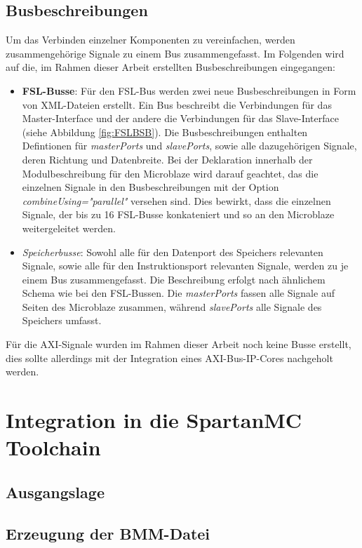 \subsection{Busbeschreibungen}\label{subsec:BusDesc}
Um das Verbinden einzelner Komponenten zu vereinfachen, werden zusammengehörige Signale zu einem Bus zusammengefasst. Im Folgenden wird auf die, im Rahmen dieser Arbeit erstellten Busbeschreibungen eingegangen:
\begin{itemize}
\item \textbf{FSL-Busse}: Für den FSL-Bus werden zwei neue Busbeschreibungen in Form von XML-Dateien erstellt. Ein Bus beschreibt die Verbindungen für das Master-Interface und der andere die Verbindungen für das Slave-Interface (siehe Abbildung \ref{fig:FSLBSB}). Die Busbeschreibungen enthalten Defintionen für \textit{masterPorts} und \textit{slavePorts}, sowie alle dazugehörigen Signale, deren Richtung und Datenbreite.
Bei der Deklaration innerhalb der Modulbeschreibung für den Microblaze wird darauf geachtet, das die einzelnen Signale in den Busbeschreibungen mit der Option \textit{combineUsing="parallel"} versehen sind. Dies bewirkt, dass die einzelnen Signale, der bis zu 16 FSL-Busse konkateniert und so an den Microblaze weitergeleitet werden.
\item \textit{Speicherbusse}: Sowohl alle für den Datenport des Speichers relevanten Signale, sowie alle für den Instruktionsport relevanten Signale, werden zu je einem Bus zusammengefasst. Die Beschreibung erfolgt nach ähnlichem Schema wie bei den FSL-Bussen. Die \textit{masterPorts} fassen alle Signale auf Seiten des Microblaze zusammen, während \textit{slavePorts} alle Signale des Speichers umfasst.
\end{itemize}
Für die AXI-Signale wurden im Rahmen dieser Arbeit noch keine Busse erstellt, dies sollte allerdings mit der Integration eines AXI-Bus-IP-Cores nachgeholt werden.

\section{Integration in die SpartanMC Toolchain}
\subsection{Ausgangslage}

\subsection{Erzeugung der BMM-Datei}

